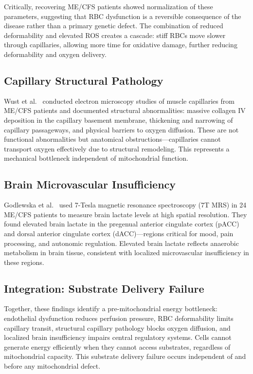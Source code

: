 Critically, recovering ME/CFS patients showed normalization of these parameters, suggesting that RBC dysfunction is a reversible consequence of the disease rather than a primary genetic defect. The combination of reduced deformability and elevated ROS creates a cascade: stiff RBCs move slower through capillaries, allowing more time for oxidative damage, further reducing deformability and oxygen delivery.

\subsection{Capillary Structural Pathology}

Wust et al.~\cite{Wust2024capillary} conducted electron microscopy studies of muscle capillaries from ME/CFS patients and documented structural abnormalities: massive collagen IV deposition in the capillary basement membrane, thickening and narrowing of capillary passageways, and physical barriers to oxygen diffusion. These are not functional abnormalities but anatomical obstructions---capillaries cannot transport oxygen effectively due to structural remodeling. This represents a mechanical bottleneck independent of mitochondrial function.

\subsection{Brain Microvascular Insufficiency}

Godlewska et al.~\cite{Godlewska2025MRS} used 7-Tesla magnetic resonance spectroscopy (7T MRS) in 24 ME/CFS patients to measure brain lactate levels at high spatial resolution. They found elevated brain lactate in the pregenual anterior cingulate cortex (pACC) and dorsal anterior cingulate cortex (dACC)---regions critical for mood, pain processing, and autonomic regulation. Elevated brain lactate reflects anaerobic metabolism in brain tissue, consistent with localized microvascular insufficiency in these regions.

\subsection{Integration: Substrate Delivery Failure}

Together, these findings identify a pre-mitochondrial energy bottleneck: endothelial dysfunction reduces perfusion pressure, RBC deformability limits capillary transit, structural capillary pathology blocks oxygen diffusion, and localized brain insufficiency impairs central regulatory systems. Cells cannot generate energy efficiently when they cannot access substrates, regardless of mitochondrial capacity. This substrate delivery failure occurs independent of and before any mitochondrial defect.

